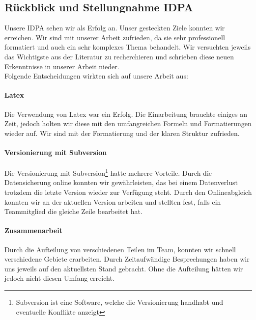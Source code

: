 \subsection{Rückblick und Stellungnahme IDPA}
Unsere IDPA sehen wir als Erfolg an. Unser gesteckten Ziele konnten wir erreichen. Wir sind mit unserer Arbeit zufrieden, da sie sehr professionell formatiert und auch ein sehr komplexes Thema behandelt. Wir versuchten jeweils das Wichtigste aus der Literatur zu recherchieren und schrieben diese neuen Erkenntnisse in unserer Arbeit nieder. \\
Folgende Entscheidungen wirkten sich auf unsere Arbeit aus:
\paragraph*{Latex}
Die Verwendung von Latex war ein Erfolg. Die Einarbeitung brauchte einiges an Zeit, jedoch holten wir diese mit den umfangreichen Formeln und Formatierungen wieder auf. Wir sind mit der Formatierung und der klaren Struktur zufrieden.
\paragraph*{Versionierung mit Subversion}
Die Versionierung mit Subversion\footnote{Subversion ist eine Software, welche die Versionierung handhabt und eventuelle Konflikte anzeigt} hatte mehrere Vorteile. Durch die Datensicherung online konnten wir gewährleisten, das bei einem Datenverlust trotzdem die letzte Version wieder zur Verfügung steht. Durch den Onlineabgleich konnten wir an der aktuellen Version arbeiten und stellten fest, falls ein Teammitglied die gleiche Zeile bearbeitet hat. 
\paragraph*{Zusammenarbeit}
Durch die Aufteilung von verschiedenen Teilen im Team, konnten wir schnell verschiedene Gebiete erarbeiten. Durch Zeitaufwändige Besprechungen haben wir uns jeweils auf den aktuellsten Stand gebracht. Ohne die Aufteilung hätten wir jedoch nicht diesen Umfang erreicht.
%
